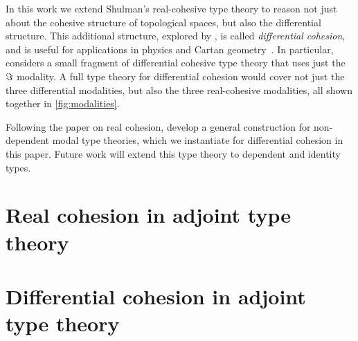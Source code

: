 \documentclass{article}
\begin{document}
In this work we extend Shulman's real-cohesive type theory to reason not just
about the cohesive structure of topological spaces, but also the differential
structure. This additional structure, explored by \citet{Schreiber2013}, is
called \emph{differential cohesion}, and is useful for applications in physics
and Cartan geometry~\citep{Wellen2017}. In particular, \citeauthor{Wellen2017}
considers a small fragment of differential cohesive type theory that uses just
the $\Im$ modality. A full type theory for differential cohesion would cover
not just the three differential modalities, but also the three real-cohesive
modalities, all shown together in \cref{fig:modalities}.

Following the \citeyear{Licata2016} paper on real cohesion, \citet{Licata2017}
develop a general construction for non-dependent modal type theories, which we
instantiate for differential cohesion in this paper. Future work will extend
this type theory to dependent and identity types.

\section{Real cohesion in adjoint type theory}


\section{Differential cohesion in adjoint type theory}





\end{document}
